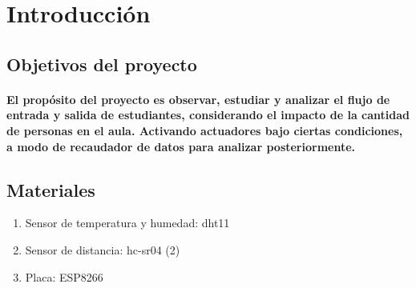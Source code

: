 \documentclass[12pt]{article} %
\newcommand{\normalparagraph}[1]{\paragraph{\textnormal{#1}}}
\begin{document}

\tableofcontents %

\newpage %


\section{Introducción} %



\subsection{Objetivos del proyecto} %
\normalparagraph{El propósito del proyecto es observar, estudiar y analizar el flujo de entrada y salida de estudiantes, considerando el impacto de la cantidad de personas en el aula. Activando actuadores bajo ciertas condiciones, a modo de recaudador de datos para analizar posteriormente. }



\subsection{Materiales} %
\begin{enumerate}[itemsep=1pt] 
    \item Sensor de temperatura y humedad: dht11
    \item Sensor de distancia: hc-sr04 (2)
    \item Placa: ESP8266
\end{enumerate}


\end{document}
